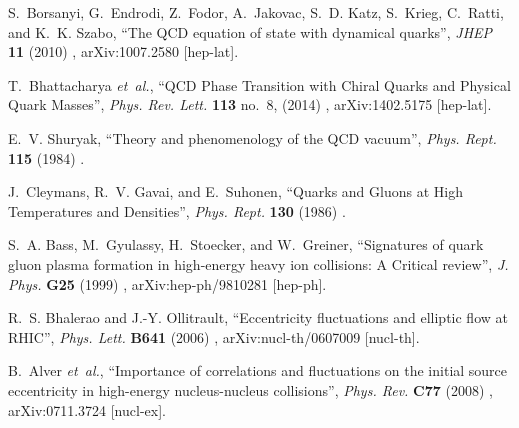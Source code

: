 \documentclass[ALICE,manyauthors]{cernphprep}
\begin{document}
\newpage

\providecommand{\href}[2]{#2}\begingroup\raggedright\begin{thebibliography}{10}

S.~Borsanyi, G.~Endrodi, Z.~Fodor, A.~Jakovac, S.~D. Katz, S.~Krieg, C.~Ratti,
  and K.~K. Szabo, ``{The QCD equation of state with dynamical quarks}'',
  \href{http://dx.doi.org/10.1007/JHEP11(2010)077}{{\em JHEP} {\bfseries 11}
  (2010) },
\href{http://arxiv.org/abs/1007.2580}{{\ttfamily arXiv:1007.2580 [hep-lat]}}.

T.~Bhattacharya {\em et~al.}, ``{QCD Phase Transition with Chiral Quarks and
  Physical Quark Masses}'',
  \href{http://dx.doi.org/10.1103/PhysRevLett.113.082001}{{\em Phys. Rev.
  Lett.} {\bfseries 113} no.~8, (2014) },
\href{http://arxiv.org/abs/1402.5175}{{\ttfamily arXiv:1402.5175 [hep-lat]}}.

E.~V. Shuryak, ``{Theory and phenomenology of the QCD vacuum}'',
\href{http://dx.doi.org/10.1016/0370-1573(84)90037-1}{{\em Phys. Rept.}
  {\bfseries 115} (1984) }.

J.~Cleymans, R.~V. Gavai, and E.~Suhonen, ``{Quarks and Gluons at High
  Temperatures and Densities}'',
\href{http://dx.doi.org/10.1016/0370-1573(86)90169-9}{{\em Phys. Rept.}
  {\bfseries 130} (1986) }.

S.~A. Bass, M.~Gyulassy, H.~Stoecker, and W.~Greiner, ``{Signatures of quark
  gluon plasma formation in high-energy heavy ion collisions: A Critical
  review}'', \href{http://dx.doi.org/10.1088/0954-3899/25/3/013}{{\em J. Phys.}
  {\bfseries G25} (1999) },
\href{http://arxiv.org/abs/hep-ph/9810281}{{\ttfamily arXiv:hep-ph/9810281
  [hep-ph]}}.

R.~S. Bhalerao and J.-Y. Ollitrault, ``{Eccentricity fluctuations and elliptic
  flow at RHIC}'', \href{http://dx.doi.org/10.1016/j.physletb.2006.08.055}{{\em
  Phys. Lett.} {\bfseries B641} (2006) },
\href{http://arxiv.org/abs/nucl-th/0607009}{{\ttfamily arXiv:nucl-th/0607009
  [nucl-th]}}.

B.~Alver {\em et~al.}, ``{Importance of correlations and fluctuations on the
  initial source eccentricity in high-energy nucleus-nucleus collisions}'',
  \href{http://dx.doi.org/10.1103/PhysRevC.77.014906}{{\em Phys. Rev.}
  {\bfseries C77} (2008) },
\href{http://arxiv.org/abs/0711.3724}{{\ttfamily arXiv:0711.3724 [nucl-ex]}}.


\end{thebibliography}
\end{document}
